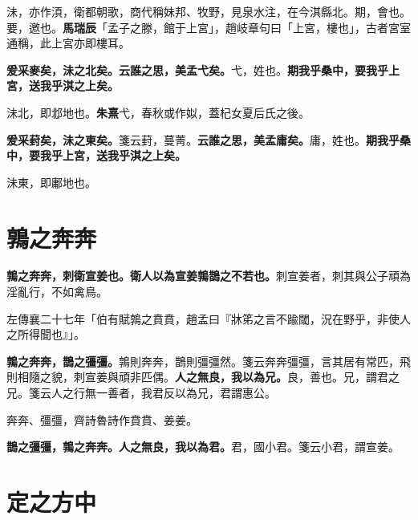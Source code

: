 \begin{quoting}沬，亦作湏，衛都朝歌，商代稱妹邦、牧野，見泉水注，在今淇縣北。期，會也。要，邀也。\textbf{馬瑞辰}「孟子之滕，館于上宮」，趙岐章句曰「上宮，樓也」，古者宮室通稱，此上宮亦即樓耳。\end{quoting}

\textbf{爰采麥矣，沬之北矣。云誰之思，美孟弋矣。}{\footnotesize 弋，姓也。}\textbf{期我乎桑中，要我乎上宮，送我乎淇之上矣。}

\begin{quoting}沬北，即邶地也。\textbf{朱熹}弋，春秋或作姒，蓋杞女夏后氏之後。\end{quoting}

\textbf{爰采葑矣，沬之東矣。}{\footnotesize 箋云葑，蔓菁。}\textbf{云誰之思，美孟庸矣。}{\footnotesize 庸，姓也。}\textbf{期我乎桑中，要我乎上宮，送我乎淇之上矣。}

\begin{quoting}沬東，即鄘地也。\end{quoting}

\section{鶉之奔奔}


\textbf{鶉之奔奔，刺衛宣姜也。衛人以為宣姜鶉鵲之不若也。}{\footnotesize 刺宣姜者，刺其與公子頑為淫亂行，不如禽鳥。}

\begin{quoting}左傳襄二十七年「伯有賦鶉之賁賁，趙孟曰『牀笫之言不踰閾，況在野乎，非使人之所得聞也』」。\end{quoting}

\textbf{鶉之奔奔，鵲之彊彊。}{\footnotesize 鶉則奔奔，鵲則彊彊然。箋云奔奔彊彊，言其居有常匹，飛則相隨之貌，刺宣姜與頑非匹偶。}\textbf{人之無良，我以為兄。}{\footnotesize 良，善也。兄，謂君之兄。箋云人之行無一善者，我君反以為兄，君謂惠公。}

\begin{quoting}奔奔、彊彊，齊詩魯詩作賁賁、姜姜。\end{quoting}

\textbf{鵲之彊彊，鶉之奔奔。人之無良，我以為君。}{\footnotesize 君，國小君。箋云小君，謂宣姜。}

\section{定之方中}


